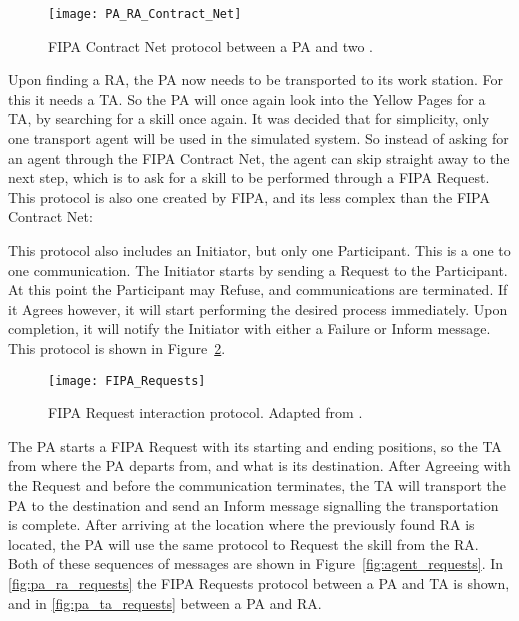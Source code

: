 \begin{figure}[h!]
	\centering
	\texttt{[image: PA\_RA\_Contract\_Net]}
	\caption{\acrshort{FIPA} Contract Net protocol between a \acrlong{PA} and two .}
	\label{fig:pa_ra_contract_net}
\end{figure}

Upon finding a \acrlong{RA}, the \acrlong{PA} now needs to be transported to its work station. For this it needs a \acrlong{TA}. So the \acrshort{PA} will once again look into the Yellow Pages for a \acrshort{TA}, by searching for a skill once again. It was decided that for simplicity, only one transport agent will be used in the simulated system. So instead of asking for an agent through the \acrshort{FIPA} Contract Net, the agent can skip straight away to the next step, which is to ask for a skill to be performed through a \acrshort{FIPA} Request. This protocol is also one created by \acrshort{FIPA}, and its less complex than the \acrshort{FIPA} Contract Net:

This protocol also includes an Initiator, but only one Participant. This is a one to one communication. The Initiator starts by sending a Request to the Participant. At this point the Participant may Refuse, and communications are terminated. If it Agrees however, it will start performing the desired process immediately. Upon completion, it will notify the Initiator with either a Failure or Inform message. This protocol is shown in Figure~\ref{fig:requests_protocol}.\\

\begin{figure}[h!]
	\centering
	\texttt{[image: FIPA\_Requests]}
	\caption{\acrshort{FIPA} Request interaction protocol. Adapted from \cite{FIPA_Request}.}
	\label{fig:requests_protocol}
\end{figure}

The \acrshort{PA} starts a \acrshort{FIPA} Request with its starting and ending positions, so the \acrshort{TA} from where the \acrshort{PA} departs from, and what is its destination. After Agreeing with the Request and before the communication terminates, the \acrshort{TA} will transport the \acrshort{PA} to the destination and send an Inform message signalling the transportation is complete. After arriving at the location where the previously found \acrshort{RA} is located, the \acrshort{PA} will use the same protocol to Request the skill from the \acrshort{RA}. Both of these sequences of messages are shown in Figure~\ref{fig:agent_requests}. In \ref{fig:pa_ra_requests} the \acrshort{FIPA} Requests protocol between a \acrshort{PA} and \acrshort{TA} is shown, and in \ref{fig:pa_ta_requests} between a \acrshort{PA} and \acrshort{RA}.\\

